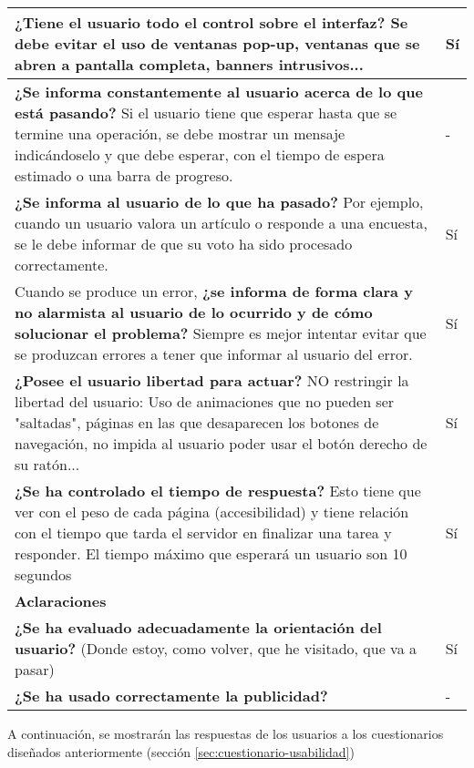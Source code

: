 \begin{longtable}[H]{p{31em}|p{5em}}
\textbf{¿Tiene el usuario todo el control sobre el interfaz?} Se debe evitar el uso de ventanas pop-up, ventanas que se abren a pantalla completa, banners intrusivos...  & Sí \\ \hline
\textbf{¿Se informa constantemente al usuario acerca de lo que está pasando?} Si el usuario tiene que esperar hasta que se termine una operación, se debe mostrar un mensaje indicándoselo y que debe esperar, con el tiempo de espera estimado o una barra de progreso.  & - \\ \hline
\textbf{¿Se informa al usuario de lo que ha pasado?} Por ejemplo, cuando un usuario valora un artículo o responde a una encuesta, se le debe informar de que su voto ha sido procesado correctamente. & Sí \\ \hline
Cuando se produce un error, \textbf{¿se informa de forma clara y no alarmista al usuario de lo ocurrido y de cómo solucionar el problema?} Siempre es mejor intentar evitar que se produzcan errores a tener que informar al usuario del error.  & Sí \\ \hline
\textbf{¿Posee el usuario libertad para actuar?} NO restringir la libertad del usuario: Uso de animaciones que no pueden ser "saltadas", páginas en las que desaparecen los botones de navegación, no impida al usuario poder usar el botón derecho de su ratón... & Sí \\ \hline
\textbf{¿Se ha controlado el tiempo de respuesta?} Esto tiene que ver con el peso de cada página (accesibilidad) y tiene relación con el tiempo que tarda el servidor en finalizar una tarea y responder. El tiempo máximo que esperará un usuario son 10 segundos  & Sí \\ \hline
\multicolumn{2}{p{36em}}{\cellcolor[rgb]{ .851,  .886,  .953} \textbf{Aclaraciones}} \\ \hline
\textbf{¿Se ha evaluado adecuadamente la orientación del usuario?} (Donde estoy, como volver, que he visitado, que va a pasar) & Sí \\ \hline
\textbf{¿Se ha usado correctamente la publicidad?} & - \\ \hline
\end{longtable}


A continuación, se mostrarán las respuestas de los usuarios a los cuestionarios diseñados anteriormente (sección \ref{sec:cuestionario-usabilidad})
